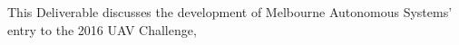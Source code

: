 This Deliverable discusses the development of Melbourne Autonomous Systems' entry to the 2016 UAV Challenge, 

